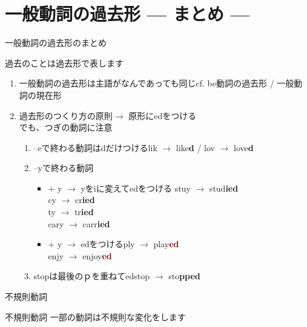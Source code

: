 \documentclass[aspectratio=169,xcolor={dvipsnames,table}]{beamer}
\begin{document}
\section{一般動詞の過去形 --- まとめ ---}
\begin{frame}[plain]{一般動詞の過去形のまとめ}
 \begin{block}{過去のことは過去形で表します}\small
\pause
\begin{enumerate}
 \item 一般動詞の過去形は主語がなんであっても同じ\hfill{}{\scriptsize cf. be動詞の過去形 / 一般動詞の現在形}\pause
 \item 過去形のつくり方の原則$\longrightarrow$ 原形にedをつける\\\pause
でも、つぎの動詞に注意\pause
       \begin{enumerate}
	\item --eで終わる動詞はdだけつける\hfill{}lik $\rightarrow$ like\textcolor{OliveGreen}{\bfseries d} / lov $\rightarrow$ love\textcolor{OliveGreen}{\bfseries d}\pause
	\item --yで終わる動詞\pause
\begin{itemize}[circle]
	         \item {} $+$ y $\longrightarrow$ yをiに変えてedをつける%
\hfill{}stuy $\rightarrow$ stud\textcolor{NavyBlue}{\bfseries ied}\\
\hfill{}cy $\rightarrow$ cr\textcolor{NavyBlue}{\bfseries ied}\\
\hfill{}ty $\rightarrow$ tr\textcolor{NavyBlue}{\bfseries ied}\\
\hfill{}cary $\rightarrow$ carr\textcolor{NavyBlue}{\bfseries ied}\pause
  \item {} $+$ y $\longrightarrow$ edをつける\hfill{}ply $\rightarrow$ play\textcolor{Maroon}{\bfseries ed}\\
\hfill{}enjy $\rightarrow$ enjoy\textcolor{Maroon}{\bfseries ed}\pause
	      \end{itemize}
	\item stopは最後のｐを重ねてed\hfill{}stop $\longrightarrow$ sto\textcolor{BurntOrange}{\bfseries pped}
       \end{enumerate}\pause
\end{enumerate}

\end{block}

\end{frame}
\begin{frame}[plain]{不規則動詞}
 
 \begin{block}{不規則動詞}\small
 一部の動詞は不規則な変化をします
\end{block}
\end{frame}
\end{document}
